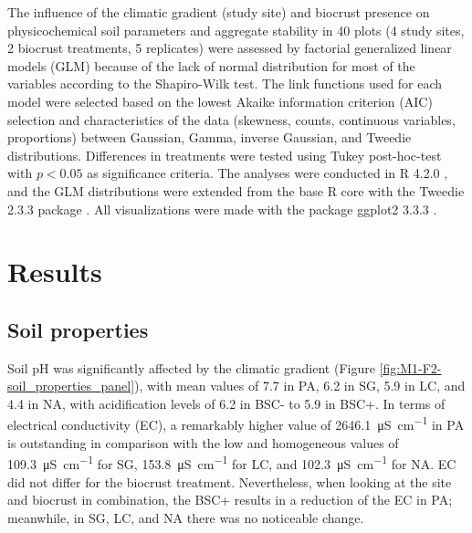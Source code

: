 The influence of the climatic gradient (study site) and biocrust presence on physicochemical soil parameters and aggregate stability in 40 plots (4 study sites, 2 biocrust treatments, 5 replicates) were assessed by factorial generalized linear models (GLM) because of the lack of normal distribution for most of the variables according to the Shapiro-Wilk test. The link functions used for each model were selected based on the lowest Akaike information criterion (AIC) selection and characteristics of the data (skewness, counts, continuous variables, proportions) between Gaussian, Gamma, inverse Gaussian, and Tweedie distributions. Differences in treatments were tested using Tukey post-hoc-test with $p <0.05$ as significance criteria. The analyses were conducted in R 4.2.0 \citep{RCoreTeam2018}, and the GLM distributions were extended from the base R core with the Tweedie 2.3.3 package \citep{Dunn2017}. All visualizations were made with the package ggplot2 3.3.3 \citep{Wickam2016}.

\section{Results}
\subsection{Soil properties}

Soil pH was significantly affected by the climatic gradient (Figure \ref{fig:M1-F2-soil_properties_panel}), with mean values of 7.7 in PA, 6.2 in SG, 5.9 in LC, and 4.4 in NA, with acidification levels of 6.2 in BSC- to 5.9 in BSC+. In terms of electrical conductivity (EC), a remarkably higher value of \SI{2646.1}{\micro\siemens\per\centi\meter} in PA is outstanding in comparison with the low and homogeneous values of \SI{109.3}{\micro\siemens\per\centi\meter} for SG, \SI{153.8}{\micro\siemens\per\centi\meter} for LC, and \SI{102.3}{\micro\siemens\per\centi\meter} for NA. EC did not differ for the biocrust treatment. Nevertheless, when looking at the site and biocrust in combination, the BSC+ results in a reduction of the EC in PA; meanwhile, in SG, LC, and NA there was no noticeable change.

